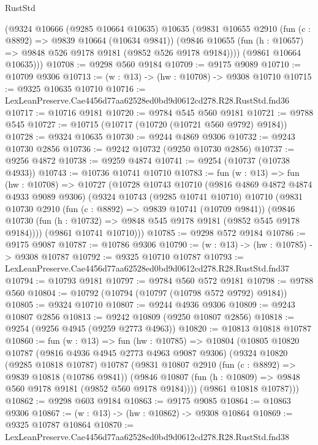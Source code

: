 \begin{lexlean}{RustStd}
\begin{coremodule}
      (@9324
        @10666
        (@9285 @10664 @10635)
        @10635
        (@9831
          @10655
          @2910
          (fun (c : @8892) => @9839 @10664 (@10634 @9841))
          (@9846 @10655 (fun (h : @10657) => @9848 @526 @9178 @9181 (@9852 @526 @9178 @9184))))
        (@9861 @10664 @10635)))
@10708 := @9298 @560 @9184
@10709 := @9175 @9089
@10710 := @10709 @9306
@10713 := (w : @13) -> (hw : @10708) -> @9308 @10710
@10715 := @9325 @10635 @10710
@10716 := LexLeanPreserve.Cae4456d77aa62528ed0bd9d0612cd278.R28.RustStd.fnd36
@10717 := @10716 @9181
@10720 := @9784 @545 @560 @9181
@10721 := @9788 @545
@10727 := @10715 (@10717 (@10720 (@10721 @560 @9792) @9184))
@10728 := @9324 @10635
@10730 := @9244 @4869 @9306
@10732 := @9243 @10730 @2856
@10736 := @9242 @10732 (@9250 @10730 @2856)
@10737 := @9256 @4872
@10738 := @9259 @4874
@10741 := @9254 (@10737 (@10738 @4933))
@10743 := @10736 @10741 @10710
@10783 := fun (w : @13) =>
  fun (hw : @10708) =>
  @10727
    (@10728
      @10743
      @10710
      (@9816 @4869 @4872 @4874 @4933 @9089 @9306)
      (@9324
        @10743
        (@9285 @10741 @10710)
        @10710
        (@9831
          @10730
          @2910
          (fun (c : @8892) => @9839 @10741 (@10709 @9841))
          (@9846 @10730 (fun (h : @10732) => @9848 @545 @9178 @9181 (@9852 @545 @9178 @9184))))
        (@9861 @10741 @10710)))
@10785 := @9298 @572 @9184
@10786 := @9175 @9087
@10787 := @10786 @9306
@10790 := (w : @13) -> (hw : @10785) -> @9308 @10787
@10792 := @9325 @10710 @10787
@10793 := LexLeanPreserve.Cae4456d77aa62528ed0bd9d0612cd278.R28.RustStd.fnd37
@10794 := @10793 @9181
@10797 := @9784 @560 @572 @9181
@10798 := @9788 @560
@10804 := @10792 (@10794 (@10797 (@10798 @572 @9792) @9184))
@10805 := @9324 @10710
@10807 := @9244 @4936 @9306
@10809 := @9243 @10807 @2856
@10813 := @9242 @10809 (@9250 @10807 @2856)
@10818 := @9254 (@9256 @4945 (@9259 @2773 @4963))
@10820 := @10813 @10818 @10787
@10860 := fun (w : @13) =>
  fun (hw : @10785) =>
  @10804
    (@10805
      @10820
      @10787
      (@9816 @4936 @4945 @2773 @4963 @9087 @9306)
      (@9324
        @10820
        (@9285 @10818 @10787)
        @10787
        (@9831
          @10807
          @2910
          (fun (c : @8892) => @9839 @10818 (@10786 @9841))
          (@9846 @10807 (fun (h : @10809) => @9848 @560 @9178 @9181 (@9852 @560 @9178 @9184))))
        (@9861 @10818 @10787)))
@10862 := @9298 @603 @9184
@10863 := @9175 @9085
@10864 := @10863 @9306
@10867 := (w : @13) -> (hw : @10862) -> @9308 @10864
@10869 := @9325 @10787 @10864
@10870 := LexLeanPreserve.Cae4456d77aa62528ed0bd9d0612cd278.R28.RustStd.fnd38

\end{coremodule}
\end{lexlean}
